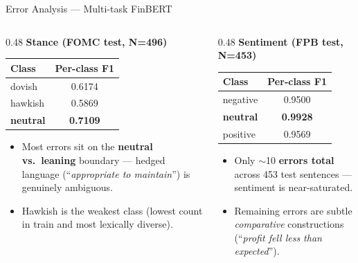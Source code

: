 \documentclass[10pt, aspectratio=169]{beamer}
\begin{document}
\begin{frame}{Error Analysis --- Multi-task FinBERT}
    \begin{columns}[T]
        \begin{column}{0.48\textwidth}
            \centering
            \textbf{Stance (FOMC test, N=496)}\\[0.3em]
            {\small
            \begin{tabular}{lc}
                \toprule
                Class & Per-class F1 \\
                \midrule
                dovish  & 0.6174 \\
                hawkish & 0.5869 \\
                \rowcolor{UNSWYellow!40}
                \textbf{neutral} & \textbf{0.7109} \\
                \bottomrule
            \end{tabular}}
            \vspace{0.6em}
            \begin{itemize}\setlength{\itemsep}{2pt}
                \item Most errors sit on the \textbf{neutral vs.\ leaning} boundary --- hedged language (``\textit{appropriate to maintain}'') is genuinely ambiguous.
                \item Hawkish is the weakest class (lowest count in train and most lexically diverse).
            \end{itemize}
        \end{column}
        \begin{column}{0.48\textwidth}
            \centering
            \textbf{Sentiment (FPB test, N=453)}\\[0.3em]
            {\small
            \begin{tabular}{lc}
                \toprule
                Class & Per-class F1 \\
                \midrule
                negative & 0.9500 \\
                \rowcolor{UNSWYellow!40}
                \textbf{neutral} & \textbf{0.9928} \\
                positive & 0.9569 \\
                \bottomrule
            \end{tabular}}
            \vspace{0.6em}
            \begin{itemize}\setlength{\itemsep}{2pt}
                \item Only $\sim$10 \textbf{errors total} across 453 test sentences --- sentiment is near-saturated.
                \item Remaining errors are subtle \textit{comparative} constructions (``\textit{profit fell less than expected}'').
            \end{itemize}
        \end{column}
    \end{columns}
\end{frame}
\end{document}
